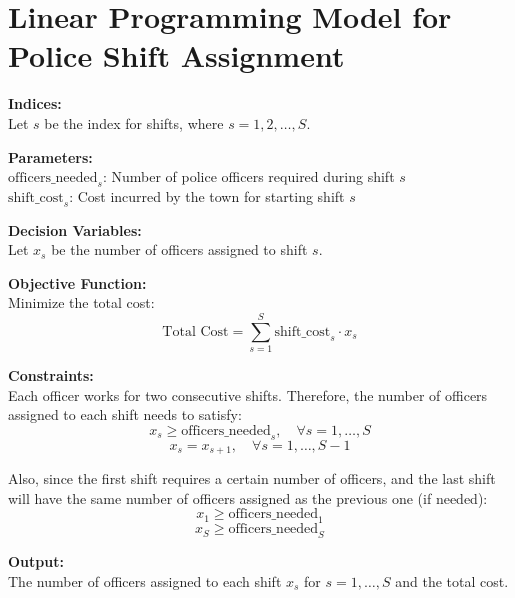 \documentclass{article}
\begin{document}
\section*{Linear Programming Model for Police Shift Assignment}

\textbf{Indices:} \\
Let \( s \) be the index for shifts, where \( s = 1, 2, \ldots, S \).

\textbf{Parameters:} \\
\( \text{officers\_needed}_{s} \): Number of police officers required during shift \( s \) \\
\( \text{shift\_cost}_{s} \): Cost incurred by the town for starting shift \( s \)

\textbf{Decision Variables:} \\
Let \( x_{s} \) be the number of officers assigned to shift \( s \).

\textbf{Objective Function:} \\
Minimize the total cost:
\[
\text{Total Cost} = \sum_{s=1}^{S} \text{shift\_cost}_{s} \cdot x_{s}
\]

\textbf{Constraints:} \\
Each officer works for two consecutive shifts. Therefore, the number of officers assigned to each shift needs to satisfy:
\[
x_{s} \geq \text{officers\_needed}_{s}, \quad \forall s = 1, \ldots, S
\]
\[
x_{s} = x_{s+1}, \quad \forall s = 1, \ldots, S-1
\]

Also, since the first shift requires a certain number of officers, and the last shift will have the same number of officers assigned as the previous one (if needed):
\[
x_{1} \geq \text{officers\_needed}_{1}
\]
\[
x_{S} \geq \text{officers\_needed}_{S}
\]

\textbf{Output:} \\
The number of officers assigned to each shift \( x_{s} \) for \( s = 1, \ldots, S \) and the total cost.
\end{document}
